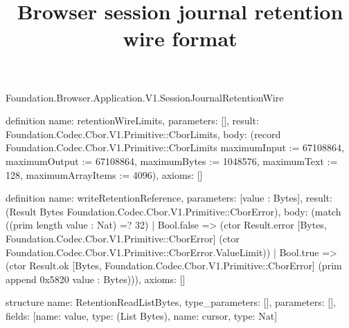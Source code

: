 \begin{lexlean}{Foundation.Browser.Application.V1.SessionJournalRetentionWire}
\title{Browser session journal retention wire format}
\begin{semanticmodule}
definition{
  name: retentionWireLimits,
  parameters: [],
  result: Foundation.Codec.Cbor.V1.Primitive::CborLimits,
  body: (record Foundation.Codec.Cbor.V1.Primitive::CborLimits {maximumInput := 67108864, maximumOutput := 67108864, maximumBytes := 1048576, maximumText := 128, maximumArrayItems := 4096}),
  axioms: []
}

definition{
  name: writeRetentionReference,
  parameters: [value : Bytes],
  result: (Result Bytes Foundation.Codec.Cbor.V1.Primitive::CborError),
  body: (match ((prim length value : Nat) =? 32)
    | Bool.false => (ctor Result.error [Bytes, Foundation.Codec.Cbor.V1.Primitive::CborError] (ctor Foundation.Codec.Cbor.V1.Primitive::CborError.ValueLimit))
    | Bool.true => (ctor Result.ok [Bytes, Foundation.Codec.Cbor.V1.Primitive::CborError] (prim append 0x5820 value : Bytes))),
  axioms: []
}

structure{
  name: RetentionReadListBytes,
  type_parameters: [],
  parameters: [],
  fields: [{name: value, type: (List Bytes)}, {name: cursor, type: Nat}]
}


\end{semanticmodule}
\end{lexlean}
